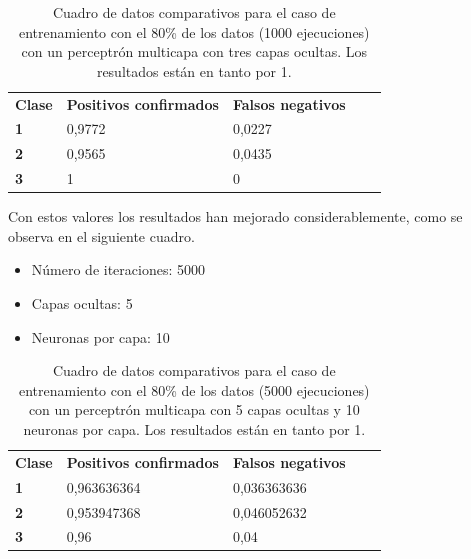 \documentclass[10pt,a4paper]{article}
\begin{document}
\begin{table}[h!]
	\centering
	\begin{tabular}{|l|l|l|ll}
		\cline{1-3}
		\multicolumn{1}{|c|}{\textbf{Clase}} & \multicolumn{1}{c|}{\textbf{Positivos confirmados}} & \multicolumn{1}{c|}{\textbf{Falsos negativos}} & \multicolumn{1}{c}{\textbf{}} &  \\ \cline{1-3}
		\textbf{1}                       &         0,9772                       &       0,0227                         &                               &  \\ \cline{1-3}
		\textbf{2}                       &         0,9565
		&       0,0435 
		&                               &  \\ \cline{1-3}
		\textbf{3}                       &         1                       &      0 &                               &  \\ \cline{1-3}
	\end{tabular}
	\caption{Cuadro de datos comparativos para el caso de entrenamiento con el 80\%{} de los datos (1000 ejecuciones) con un perceptrón multicapa con tres capas ocultas. Los resultados están en tanto por 1.}
	\label{tab:ej5_20porcent_3hidden_1000}
\end{table}

Con estos valores los resultados han mejorado considerablemente, como se observa en el siguiente cuadro.\\

\newpage
\begin{itemize}
	\item Número de iteraciones: 5000
	\item Capas ocultas: 5 
	\item Neuronas por capa: 10
\end{itemize}
\begin{table}[h!]
	\centering
	\begin{tabular}{|l|l|l|ll}
		\cline{1-3}
		\multicolumn{1}{|c|}{\textbf{Clase}} & \multicolumn{1}{c|}{\textbf{Positivos confirmados}} & \multicolumn{1}{c|}{\textbf{Falsos negativos}} & \multicolumn{1}{c}{\textbf{}} &  \\ \cline{1-3}
		\textbf{1}                       &        0,963636364
		                      &       0,036363636
		                                             &                               &  \\ \cline{1-3}
		\textbf{2}                       &         0,953947368
		&       0,046052632 
		&                               &  \\ \cline{1-3}
		\textbf{3}                       &         0,96
		                       &      0,04
		                        &                               &  \\ \cline{1-3}
	\end{tabular}
	\caption{Cuadro de datos comparativos para el caso de entrenamiento con el 80\%{} de los datos (5000 ejecuciones) con un perceptrón multicapa con 5 capas ocultas y 10 neuronas por capa. Los resultados están en tanto por 1.}
	\label{tab:ej5_20porcent_5hidden_5000}
\end{table}
\end{document}
